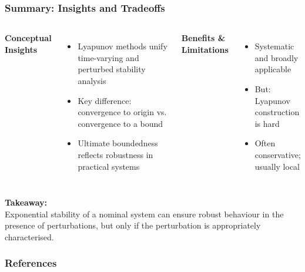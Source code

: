\documentclass[student, noshadow, lsr, english, aspectratio=169, t]{ITR_LSR_slides}
\begin{document}
\begin{frame}
    \frametitle{Summary: Insights and Tradeoffs}
    \begin{columns}[t]
        \textbf{Conceptual Insights}
        \begin{itemize}
            \item Lyapunov methods unify time-varying and perturbed stability analysis
            \item Key difference: convergence to origin vs. convergence to a bound
            \item Ultimate boundedness reflects robustness in practical systems
        \end{itemize}

        \textbf{Benefits \& Limitations}
        \begin{itemize}
            \item Systematic and broadly applicable
            \item But: Lyapunov construction is hard
            \item Often conservative; usually local
        \end{itemize}
    \end{columns}
    \vspace{1em}
    \textbf{Takeaway:} \\
	Exponential stability of a nominal system can ensure robust behaviour in the presence of perturbations, but only if the perturbation is appropriately characterised.

\end{frame}



\appendix

\begin{frame}[allowframebreaks]
    \frametitle{References}
    \nocite{*} 
    \printbibliography[heading=none]
\end{frame}
\end{document}
